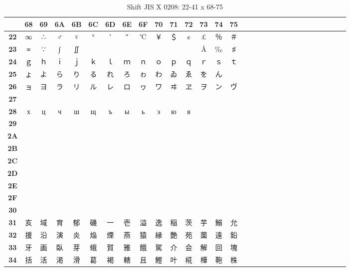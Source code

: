 \begin{table}[H]
\Fontified
\centering
\caption{Shift JIS X 0208: 22-41 x 68-75}
\begin{tabular}{|Sc|Sc|Sc|Sc|Sc|Sc|Sc|Sc|Sc|Sc|Sc|Sc|Sc|Sc|Sc|}
\hline
 & \textbf{68} & \textbf{69} & \textbf{6A} & \textbf{6B} & \textbf{6C} & \textbf{6D} & \textbf{6E} & \textbf{6F} & \textbf{70} & \textbf{71} & \textbf{72} & \textbf{73} & \textbf{74} & \textbf{75} \\ \hline
\textbf{22} & ∞ & ∴ & ♂ & ♀ & ° & ′ & ″ & ℃ & ￥ & ＄ & ¢ & £ & ％ & ＃ \\ \hline
\textbf{23} & ∝ & ∵ & ∫ & ∬ &  &  &  &  &  &  &  & Å & ‰ & ♯ \\ \hline
\textbf{24} & ｇ & ｈ & ｉ & ｊ & ｋ & ｌ & ｍ & ｎ & ｏ & ｐ & ｑ & ｒ & ｓ & ｔ \\ \hline
\textbf{25} & ょ & よ & ら & り & る & れ & ろ & ゎ & わ & ゐ & ゑ & を & ん &  \\ \hline
\textbf{26} & ョ & ヨ & ラ & リ & ル & レ & ロ & ヮ & ワ & ヰ & ヱ & ヲ & ン & ヴ \\ \hline
\textbf{27} &  &  &  &  &  &  &  &  &  &  &  &  &  &  \\ \hline
\textbf{28} & х & ц & ч & ш & щ & ъ & ы & ь & э & ю & я &  &  &  \\ \hline
\textbf{29} &  &  &  &  &  &  &  &  &  &  &  &  &  &  \\ \hline
\textbf{2A} &  &  &  &  &  &  &  &  &  &  &  &  &  &  \\ \hline
\textbf{2B} &  &  &  &  &  &  &  &  &  &  &  &  &  &  \\ \hline
\textbf{2C} &  &  &  &  &  &  &  &  &  &  &  &  &  &  \\ \hline
\textbf{2D} &  &  &  &  &  &  &  &  &  &  &  &  &  &  \\ \hline
\textbf{2E} &  &  &  &  &  &  &  &  &  &  &  &  &  &  \\ \hline
\textbf{2F} &  &  &  &  &  &  &  &  &  &  &  &  &  &  \\ \hline
\textbf{30} &  &  &  &  &  &  &  &  &  &  &  &  &  &  \\ \hline
\textbf{31} & 亥 & 域 & 育 & 郁 & 磯 & 一 & 壱 & 溢 & 逸 & 稲 & 茨 & 芋 & 鰯 & 允 \\ \hline
\textbf{32} & 援 & 沿 & 演 & 炎 & 焔 & 煙 & 燕 & 猿 & 縁 & 艶 & 苑 & 薗 & 遠 & 鉛 \\ \hline
\textbf{33} & 牙 & 画 & 臥 & 芽 & 蛾 & 賀 & 雅 & 餓 & 駕 & 介 & 会 & 解 & 回 & 塊 \\ \hline
\textbf{34} & 括 & 活 & 渇 & 滑 & 葛 & 褐 & 轄 & 且 & 鰹 & 叶 & 椛 & 樺 & 鞄 & 株 \\ \hline

\end{tabular}
\end{table}
